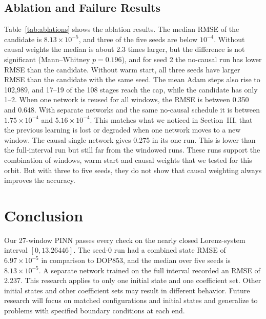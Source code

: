 \documentclass[conference]{IEEEtran}
\begin{document}
\subsection{Ablation and Failure Results}
Table~\ref{tab:ablations} shows the ablation results. The median RMSE of the candidate is $8.13\times10^{-5}$, and three of the five seeds are below $10^{-4}$. Without causal weights the median is about 2.3 times larger, but the difference is not significant (Mann--Whitney $p=0.196$), and for seed 2 the no-causal run has lower RMSE than the candidate. Without warm start, all three seeds have larger RMSE than the candidate with the same seed. The mean Adam steps also rise to 102,989, and 17--19 of the 108 stages reach the cap, while the candidate has only 1--2. When one network is reused for all windows, the RMSE is between 0.350 and 0.648. With separate networks and the same no-causal schedule it is between $1.75\times10^{-4}$ and $5.16\times10^{-4}$. This matches what we noticed in Section~III, that the previous learning is lost or degraded when one network moves to a new window. The causal single network gives 0.275 in its one run. This is lower than the full-interval run but still far from the windowed runs. These runs support the combination of windows, warm start and causal weights that we tested for this orbit. But with three to five seeds, they do not show that causal weighting always improves the accuracy.

\section{Conclusion}

Our 27-window PINN passes every check on the nearly closed Lorenz-system interval $[0,13.26446]$. The seed-0 run had a combined state RMSE of $6.97\times10^{-5}$ in comparison to DOP853, and the median over five seeds is $8.13\times10^{-5}$. A separate network trained on the full interval recorded an RMSE of 2.237. This research applies to only one initial state and one coefficient set. Other initial states and other coefficient sets may result in different behavior. Future research will focus on matched configurations and initial states and generalize to problems with specified boundary conditions at each end.










\end{document}
